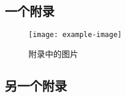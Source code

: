 \cleardoublepage

{

    \appendixsubsecmajornumbering

    \subsection{一个附录}

    \begin{figure}[htb]
        \centering
        \texttt{[image: example-image]}
        \caption{附录中的图片}
        \label{fig:test-appendix}
    \end{figure}

    \subsection{另一个附录}
}